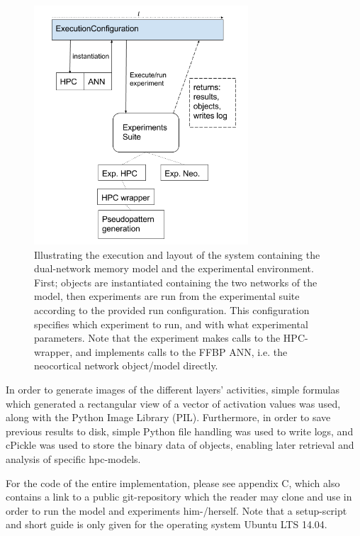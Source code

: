 \begin{figure}
    \centering
    \includegraphics[width=8cm]{fig/ExecutionConfiguration.png}
    \caption{Illustrating the execution and layout of the system containing the dual-network memory model and the experimental environment. First; objects are instantiated containing the two networks of the model, then experiments are run from the experimental suite according to the provided run configuration. This configuration specifies which experiment to run, and with what experimental parameters. Note that the experiment makes calls to the HPC-wrapper, and implements calls to the FFBP ANN, i.e. the neocortical network object/model directly.}
    \label{fig:system_layout}
\end{figure}

In order to generate images of the different layers' activities, simple formulas which generated a rectangular view of a vector of activation values was used, along with the Python Image Library (PIL). Furthermore, in order to save previous results to disk, simple Python file handling was used to write logs, and cPickle was used to store the binary data of objects, enabling later retrieval and analysis of specific hpc-models.

For the code of the entire implementation, please see appendix C, which also contains a link to a public git-repository which the reader may clone and use in order to run the model and experiments him-/herself. Note that a setup-script and short guide is only given for the operating system Ubuntu LTS 14.04.






